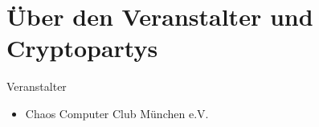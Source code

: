 \section{Über den Veranstalter und Cryptopartys}
\begin{frame}{Veranstalter}
  \begin{itemize}
    \item Chaos Computer Club München e.V.
  \end{itemize}
\end{frame}

\endinput
